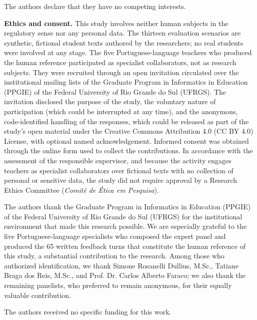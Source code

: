 \documentclass{sbc2023}%
\begin{document}
\begin{interests}
The authors declare that they have no competing interests.
\end{interests}

\noindent\textbf{Ethics and consent.} This study involves neither human subjects in the regulatory sense nor any personal data. The thirteen evaluation scenarios are synthetic, fictional student texts authored by the researchers; no real students were involved at any stage. The five Portuguese-language teachers who produced the human reference participated as specialist collaborators, not as research subjects. They were recruited through an open invitation circulated over the institutional mailing lists of the Graduate Program in Informatics in Education (PPGIE) of the Federal University of Rio Grande do Sul (UFRGS). The invitation disclosed the purpose of the study, the voluntary nature of participation (which could be interrupted at any time), and the anonymous, code-identified handling of the responses, which could be released as part of the study's open material under the Creative Commons Attribution 4.0 (CC BY 4.0) License, with optional named acknowledgement. Informed consent was obtained through the online form used to collect the contributions. In accordance with the assessment of the responsible supervisor, and because the activity engages teachers as specialist collaborators over fictional texts with no collection of personal or sensitive data, the study did not require approval by a Research Ethics Committee (\textit{Comitê de Ética em Pesquisa}).

\begin{acknowledgements}
The authors thank the Graduate Program in Informatics in Education (PPGIE) of the Federal University of Rio Grande do Sul (UFRGS) for the institutional environment that made this research possible. We are especially grateful to the five Portuguese-language specialists who composed the expert panel and produced the 65 written feedback turns that constitute the human reference of this study, a substantial contribution to the research. Among those who authorized identification, we thank Simone Rosanelli Dullius, M.Sc., Tatiane Braga dos Reis, M.Sc., and Prof. Dr. Carlos Alberto Faraco; we also thank the remaining panelists, who preferred to remain anonymous, for their equally valuable contribution.
\end{acknowledgements}

\begin{funding}
The authors received no specific funding for this work.
\end{funding}
\end{document}

